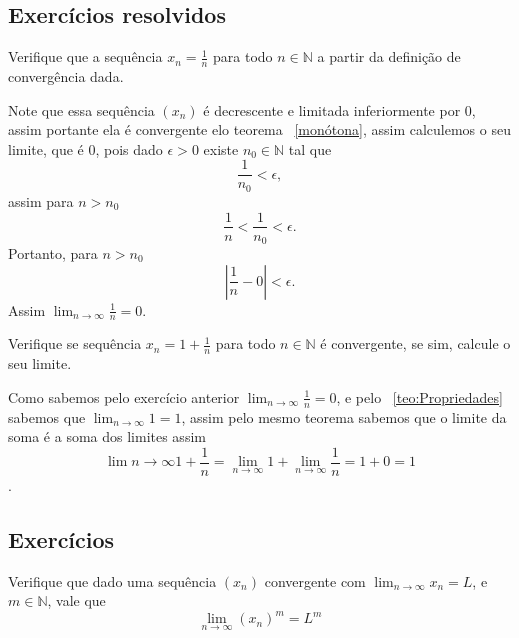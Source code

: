 \subsection*{Exercícios resolvidos}

\construirExeresol

\begin{exeresol}
    Verifique que a sequência $x_n = \frac{1}{n}$ para todo $n \in \mathbb{N}$ a 
    partir da definição de convergência dada.
\end{exeresol}

\begin{resol}
    Note que essa sequência $(x_n)$ é decrescente e limitada inferiormente por 0,
    assim portante ela é convergente elo teorema ~\ref{monótona}, assim calculemos
    o seu limite, que é $0$, pois dado $\epsilon > 0$ existe $n_0 \in \mathbb{N}$
    tal que
    $$\frac{1}{n_0}< \epsilon,$$
    assim para $n>n_0$
    $$\frac{1}{n} < \frac{1}{n_0} < \epsilon.$$
    Portanto, para $n>n_0$
    $$|\frac{1}{n} - 0| < \epsilon.$$
    Assim $\lim_{n \to \infty} \frac{1}{n} = 0$.
\end{resol}

\begin{exeresol}
    Verifique se sequência $x_n = 1 + \frac{1}{n}$ para todo $n \in \mathbb{N}$ 
    é convergente, se sim, calcule o seu limite.
\end{exeresol}
    
\begin{resol}
    Como sabemos pelo exercício anterior $\lim_{n \to \infty} \frac{1}{n} = 0$, e pelo
    ~\ref{teo:Propriedades} sabemos que $\lim_{n \to \infty} 1 = 1$, assim pelo mesmo teorema
    sabemos que o limite da soma é a soma dos limites assim
    $$\lim{n \to \infty} 1 +\frac{1}{n} = \lim_{n \to \infty} 1 + \lim_{n \to \infty} \frac{1}{n} = 1 + 0 = 1$$.
\end{resol}

\subsection*{Exercícios}

\construirExer

\begin{exer}
    Verifique que dado uma sequência $(x_n)$ convergente com $\lim_{n \to \infty} x_n = L$,
    e $m \in \mathbb{N}$, vale que
    $$ \lim_{n \to \infty} (x_n)^m = L^m$$
\end{exer}



